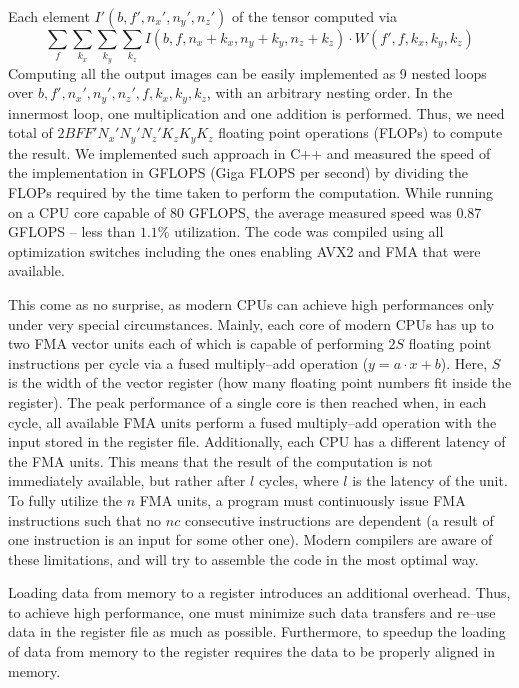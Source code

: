   Each element $I'(b,f',n_x',n_y',n_z')$ of the tensor computed via
  {\footnotesize
  \begin{equation}
  \sum_{f} \sum_{k_x} \sum_{k_y} \sum_{k_z}
  I(b,f,n_x+k_x,n_y+k_y,n_z+k_z) \cdot W(f',f,k_x,k_y,k_z)
  \label{eqn:forward}
  \end{equation}
  } Computing all the output images can be easily implemented as 9
  nested loops over $b,f',n_x',n_y',n_z',f,k_x,k_y,k_z$, with an
  arbitrary nesting order.  In the innermost loop, one multiplication
  and one addition is performed.  Thus, we need total of
  $2BFF'N_x'N_y'N_z'K_zK_yK_z$ floating point operations (FLOPs) to
  compute the result.  We implemented such approach in C++ and
  measured the speed of the implementation in GFLOPS (Giga FLOPS per
  second) by dividing the FLOPs required by the time taken to perform
  the computation.  While running on a CPU core capable of $80$
  GFLOPS, the average measured speed was $0.87$ GFLOPS -- less than
  $1.1\%$ utilization.  The code was compiled using all optimization
  switches including the ones enabling AVX2 and FMA that were
  available.

  This come as no surprise, as modern CPUs can achieve high
  performances only under very special circumstances.  Mainly, each
  core of modern CPUs has up to two FMA vector units each of which is
  capable of performing $2S$ floating point instructions per cycle via
  a fused multiply--add operation ($y = a\cdot x + b$).  Here, $S$ is
  the width of the vector register (how many floating point numbers
  fit inside the register).  The peak performance of a single core is
  then reached when, in each cycle, all available FMA units perform a
  fused multiply--add operation with the input stored in the register
  file.  Additionally, each CPU has a different latency of the FMA
  units.  This means that the result of the computation is not
  immediately available, but rather after $l$ cycles, where $l$ is the
  latency of the unit.  To fully utilize the $n$ FMA units, a program
  must continuously issue FMA instructions such that no $nc$
  consecutive instructions are dependent (a result of one instruction
  is an input for some other one).  Modern compilers are aware of
  these limitations, and will try to assemble the code in the most
  optimal way.

  Loading data from memory to a register introduces an additional
  overhead.  Thus, to achieve high performance, one must minimize such
  data transfers and re--use data in the register file as much as
  possible.  Furthermore, to speedup the loading of data from memory
  to the register requires the data to be properly aligned in memory.

